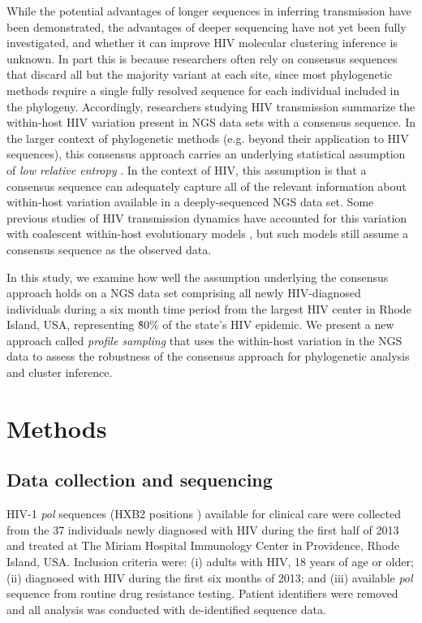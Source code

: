 \documentclass[letterpaper]{article}
\begin{document}
While the potential advantages of longer sequences in inferring transmission have been demonstrated, the advantages of deeper sequencing have not yet been fully investigated, and whether it can improve HIV molecular clustering inference is unknown. In part this is because researchers often rely on consensus sequences that discard all but the majority variant at each site, since most phylogenetic methods require a single fully resolved sequence for each individual included in the phylogeny. Accordingly, researchers studying HIV transmission summarize the within-host HIV variation present in NGS data sets with a consensus sequence. In the larger context of phylogenetic methods (e.g. beyond their application to HIV sequences), this consensus approach carries an underlying statistical assumption of \emph{low relative entropy} \parencite{guang}. In the context of HIV, this assumption is that a consensus sequence can adequately capture all of the relevant information about within-host variation available in a deeply-sequenced NGS data set. Some previous studies of HIV transmission dynamics have accounted for this variation with coalescent within-host evolutionary models \parencite{giardina, romero-severson}, but such models still assume a consensus sequence as the observed data.

In this study, we examine how well the assumption underlying the consensus approach holds on a NGS data set comprising all newly HIV-diagnosed individuals during a six month time period from the largest HIV center in Rhode Island, USA, representing \~80\% of the state's HIV epidemic. We present a new approach called \emph{profile sampling} that uses the within-host variation in the NGS data to assess the robustness of the consensus approach for phylogenetic analysis and cluster inference.

\section*{Methods}

\subsection*{Data collection and sequencing}

HIV-1 \emph{pol} sequences (HXB2 positions ) available for clinical care were collected from the 37 individuals newly diagnosed with HIV during the first half of 2013 and treated at The Miriam Hospital Immunology Center in Providence, Rhode Island, USA. Inclusion criteria were: (i) adults with HIV, 18 years of age or older; (ii) diagnosed with HIV during the first six months of 2013; and (iii) available \emph{pol} sequence from routine drug resistance testing. Patient identifiers were removed and all analysis was conducted with de-identified sequence data.
\end{document}
